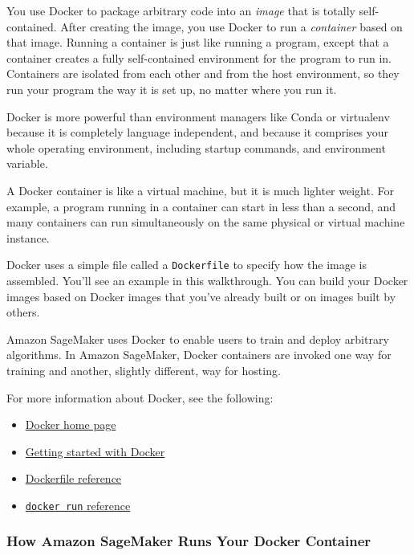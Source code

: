 \documentclass[11pt]{article}
\providecommand{\tightlist}{%
      \setlength{\itemsep}{0pt}\setlength{\parskip}{0pt}}
\begin{document}
You use Docker to package arbitrary code into an \emph{image} that is
totally self-contained. After creating the image, you use Docker to run
a \emph{container} based on that image. Running a container is just like
running a program, except that a container creates a fully
self-contained environment for the program to run in. Containers are
isolated from each other and from the host environment, so they run your
program the way it is set up, no matter where you run it.

Docker is more powerful than environment managers like Conda or
virtualenv because it is completely language independent, and because it
comprises your whole operating environment, including startup commands,
and environment variable.

A Docker container is like a virtual machine, but it is much lighter
weight. For example, a program running in a container can start in less
than a second, and many containers can run simultaneously on the same
physical or virtual machine instance.

Docker uses a simple file called a \texttt{Dockerfile} to specify how
the image is assembled. You'll see an example in this walkthrough. You
can build your Docker images based on Docker images that you've already
built or on images built by others.

Amazon SageMaker uses Docker to enable users to train and deploy
arbitrary algorithms. In Amazon SageMaker, Docker containers are invoked
one way for training and another, slightly different, way for hosting.

For more information about Docker, see the following:

\begin{itemize}
\tightlist
\item
  \href{http://www.docker.com}{Docker home page}
\item
  \href{https://docs.docker.com/get-started/}{Getting started with
  Docker}
\item
  \href{https://docs.docker.com/engine/reference/builder/}{Dockerfile
  reference}
\item
  \href{https://docs.docker.com/engine/reference/run/}{\texttt{docker\ run}
  reference}
\end{itemize}

\subsubsection{How Amazon SageMaker Runs Your Docker
Container}\label{how-amazon-sagemaker-runs-your-docker-container}
\end{document}
